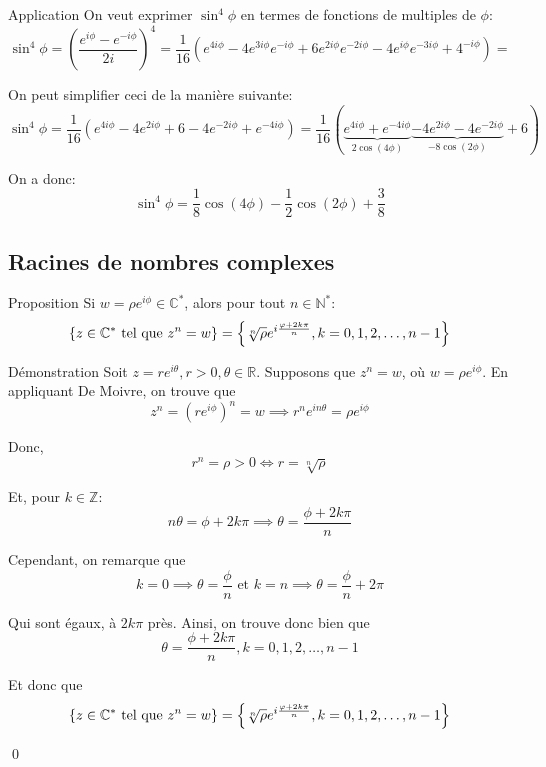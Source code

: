 \documentclass[a4paper]{article}
\begin{document}
\begin{parag}{Application}
    On veut exprimer $\sin^{4} \phi$ en termes de fonctions de multiples de $\phi$:
    \[\sin^4 \phi = \left(\frac{e^{i\phi} - e^{-i\phi}}{2i}\right)^{4} = \frac{1}{16} \left(e^{4i\phi} - 4e^{3i\phi} e^{-i\phi} + 6 e^{2i\phi} e^{-2i\phi} - 4 e^{i\phi} e^{-3i\phi} + 4^{-i\phi}\right) = \]

    On peut simplifier ceci de la manière suivante:
    \[\sin^{4} \phi = \frac{1}{16}\left(e^{4i\phi} - 4e^{2i\phi} + 6 - 4e^{-2i\phi} + e^{-4i\phi}\right) = \frac{1}{16}\left(\underbrace{e^{4i\phi} + e^{-4i\phi}}_{2\cos\left(4\phi\right)} \underbrace{- 4e^{2i\phi} -4e^{-2i\phi}}_{-8\cos\left(2\phi\right)} + 6\right)\]

    On a donc:
    \[\sin^4 \phi = \frac{1}{8} \cos\left(4\phi\right) - \frac{1}{2}\cos\left(2\phi\right) + \frac{3}{8}\]

\end{parag}

\subsection{Racines de nombres complexes}
\begin{parag}{Proposition}
    Si $w = \rho e^{i\phi} \in \mathbb{C}^*$, alors pour tout $n \in \mathbb{N}^*$:
    \[\left\{z \in \mathbb{C}^* \telque z^{n} = w\right\} = \left\{\sqrt[n]{\rho}e^{i \frac{\phi + 2k\pi}{n}}, k = 0, 1 , 2, \ldots, n-1\right\}\]

    \begin{subparag}{Démonstration}
        Soit $z = re^{i\theta}, r > 0, \theta \in \mathbb{R}$. Supposons que $z^{n} = w$, où $w = \rho e^{i\phi}$. En appliquant De Moivre, on trouve que
        \[z^{n} = \left(r e^{i\phi}\right)^{n} = w \implies r^n e^{in \theta} = \rho e^{i\phi}\]

        Donc,
        \[r^{n} = \rho > 0 \iff r = \sqrt[n]{\rho}\]

        Et, pour $k \in \mathbb{Z}$:
        \[n\theta = \phi + 2k\pi \implies \theta = \frac{\phi + 2k\pi}{n}\]

        Cependant, on remarque que
        \[k = 0 \implies \theta = \frac{\phi}{n} \text{ et } k = n \implies \theta = \frac{\phi}{n} + 2\pi\]

        Qui sont égaux, à $2k\pi$ près. Ainsi, on trouve donc bien que
        \[\theta = \frac{\phi + 2k\pi}{n}, k = 0, 1, 2, \ldots, n - 1\]

        Et donc que
        \[\left\{z \in \mathbb{C}^* \telque z^{n} = w\right\} = \left\{\sqrt[n]{\rho}e^{i \frac{\phi + 2k\pi}{n}}, k = 0, 1 , 2, \ldots, n-1\right\}\]

        \qed
    \end{subparag}

\end{parag}
\end{document}
